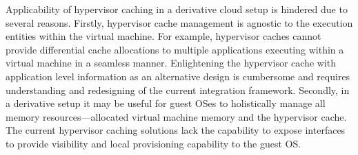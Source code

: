 Applicability of hypervisor caching in a derivative cloud setup is 
hindered due to several reasons. Firstly, hypervisor cache management 
is agnostic to the execution entities within the virtual machine. 
For example, hypervisor caches cannot provide differential cache 
allocations to multiple applications executing within a virtual machine
in a seamless manner.
%
Enlightening the hypervisor cache with application level information 
as an alternative design is cumbersome and requires understanding and 
redesigning of the current integration framework. 
%
Secondly, in a derivative setup it may be useful for
guest OSes to holistically manage all memory resources---allocated
virtual machine memory and the hypervisor cache.
%
The current hypervisor caching solutions lack the capability to 
expose interfaces 
to provide visibility and local provisioning capability to the guest OS. 
%
%
%
%
%
%



